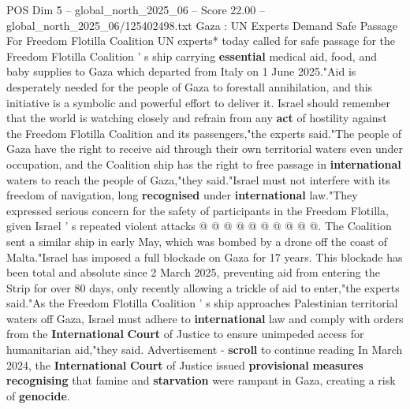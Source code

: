 \begin{textsample}{POS Dim 5 – global\_north\_2025\_06 – Score 22.00 – global\_north\_2025\_06/125402498.txt}  \label{ex:f5_pos_062}
Gaza : UN Experts Demand Safe Passage For Freedom Flotilla Coalition UN experts* today called for safe passage for the Freedom Flotilla Coalition ' s ship carrying \textbf{essential} medical aid, food, and baby supplies to Gaza which departed from Italy on 1 June 2025."Aid is desperately needed for the people of Gaza to forestall annihilation, and this initiative is a symbolic and powerful effort to deliver it.
Israel should remember that the world is watching closely and refrain from any \textbf{act} of hostility against the Freedom Flotilla Coalition and its passengers,"the experts said."The people of Gaza have the right to receive aid through their own territorial waters even under occupation, and the Coalition ship has the right to free passage in \textbf{international} waters to reach the people of Gaza,"they said."Israel must not interfere with its freedom of navigation, long \textbf{recognised} under \textbf{international} law."They expressed serious concern for the safety of participants in the Freedom Flotilla, given Israel ' s repeated violent attacks @ @ @ @ @ @ @ @ @ @.
The Coalition sent a similar ship in early May, which was bombed by a drone off the coast of Malta."Israel has imposed a full blockade on Gaza for 17 years.
This blockade has been total and absolute since 2 March 2025, preventing aid from entering the Strip for over 80 days, only recently allowing a trickle of aid to enter,"the experts said."As the Freedom Flotilla Coalition ' s ship approaches Palestinian territorial waters off Gaza, Israel must adhere to \textbf{international} law and comply with orders from the \textbf{International} \textbf{Court} of Justice to ensure unimpeded access for humanitarian aid,"they said.
Advertisement - \textbf{scroll} to continue reading In March 2024, the \textbf{International} \textbf{Court} of Justice issued \textbf{provisional} \textbf{measures} \textbf{recognising} that famine and \textbf{starvation} were rampant in Gaza, creating a risk of \textbf{genocide}.

\end{textsample}
